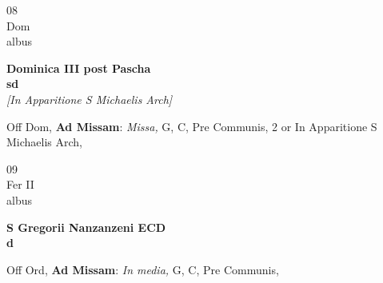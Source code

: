 \documentclass[10pt, openany]{book}
\begin{document}
        \begin{center}
            \begin{minipage}{3.5in}
                \vspace{2em}
                \begin{minipage}{0.5in}
                    {\Huge 08} \\
                    {\normalsize Dom} \\
                    {\normalsize albus}
                \end{minipage}
                \begin{minipage}{3.0in}
                    \textbf{ \large Dominica III post Pascha \\
                    \textnormal{\normalsize sd}} \\ \textit{[In Apparitione S Michaelis Arch]} \\ 
                \end{minipage}
                \begin{justify}Off Dom, \textbf{Ad Missam}: \textit{Missa,} G, C, Pre Communis, 2 or In Apparitione S Michaelis Arch,  
                \end{justify}
            \end{minipage}
        \end{center}
    
        \begin{center}
            \begin{minipage}{3.5in}
                \vspace{2em}
                \begin{minipage}{0.5in}
                    {\Huge 09} \\
                    {\normalsize Fer II} \\
                    {\normalsize albus}
                \end{minipage}
                \begin{minipage}{3.0in}
                    \textbf{ \large S Gregorii Nanzanzeni ECD \\
                    \textnormal{\normalsize d}} \\ 
                \end{minipage}
                \begin{justify}Off Ord, \textbf{Ad Missam}: \textit{In media,} G, C, Pre Communis,  
                \end{justify}
            \end{minipage}
        \end{center}
    
\end{document}
